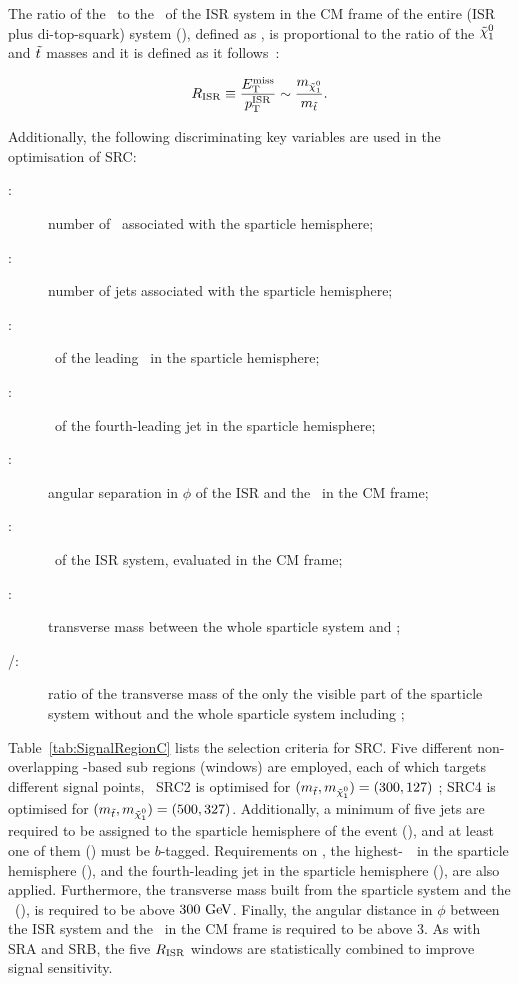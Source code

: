 				The ratio of the \met\ to the \pt\ of the \ac{ISR} system in the \ac{CM} frame of the entire (\ac{ISR} plus di-top-squark) system (\pTISR), defined as \rISR, is proportional to the ratio of the $\ninoone$ and $\tilde{t}$ masses and it is defined as it follows~\cite{An,Macaluso}:
				
				\begin{equation*}
					\rISR \equiv \frac{\met}{\pTISR} \sim \frac{m_{\ninoone}}{m_{\stop}}. 
				\end{equation*}

				\noindent Additionally, the following discriminating key variables are used in the optimisation of SRC: 

				\begin{description}
					\item[\boldmath \nBJetS:] number of \bjs\ associated with the sparticle hemisphere;
					\item[\boldmath \nJetS:] number of jets associated with the sparticle hemisphere;
					\item[\boldmath \pTSBZero:] \pt\ of the leading \bj\ in the sparticle hemisphere;
					\item[\boldmath \pTSFour:] \pt\ of the fourth-leading jet in the sparticle hemisphere;
					\item[\boldmath \dPhiISRMET:] angular separation in $\phi$ of the \ac{ISR} and the \met\ in the \ac{CM} frame;
					\item[\boldmath \pTISR:] \pt\ of the \ac{ISR} system, evaluated in the \ac{CM} frame;
					\item[\boldmath \mS:] transverse mass between the whole sparticle system and \met;
					\item[\boldmath \mV/\mS:] ratio of the transverse mass of the only the visible part of the sparticle system without \met and the whole sparticle system including \met;
				\end{description}				

				Table~\ref{tab:SignalRegionC} lists the selection criteria for SRC. Five different non-overlapping \RISR-based sub regions (windows) are employed, each of which targets different signal points, \eg\ SRC2 is optimised for $(\mstop, \mninoone) = (300,127) $ \GeV; SRC4 is optimised for $(\mstop, \mninoone) = (500,327)$. Additionally, a minimum of five jets are required to be assigned to the sparticle hemisphere of the event (\nJetS), and at least one of them (\nBJetS) must be $b$-tagged. Requirements on \pTISR, the highest-\pt\ \bj\ in the sparticle hemisphere (\pTSBZero), and the fourth-leading jet in the sparticle hemisphere (\pTSFour), are also applied. Furthermore, the transverse mass built from the sparticle system and the \met\ (\mS), is required to be above $300\GeV$. Finally, the angular distance in $\phi$ between the \ac{ISR} system and the \ptmiss\ in the \ac{CM} frame is required to be above $3$. As with SRA and SRB, the five $R_{\mathrm{ISR}}$ windows are statistically combined to improve signal sensitivity.





